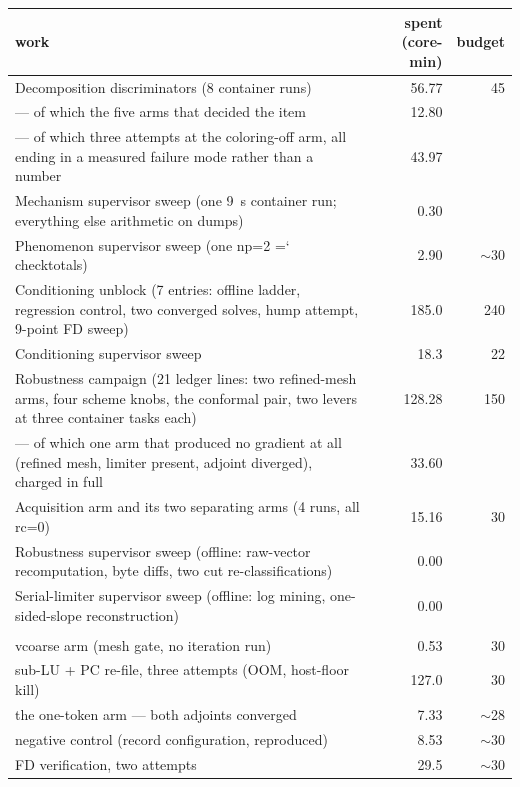 \documentclass[11pt,a4paper]{article}
\newcommand{\artifact}[1]{{\small\ttfamily\hyphenchar\font=`\-\relax
  \def\_{\textunderscore\allowbreak}#1}}
\begin{document}
\begin{table}[htbp]
\centering\scriptsize
\begin{tabular}{@{}L{7.0cm}rr@{}}
\toprule
work & spent (core-min) & budget \\
\midrule
Decomposition discriminators (8 container runs) & 56.77 & 45 \\
\quad --- of which the five arms that decided the item & 12.80 & \\
\quad --- of which three attempts at the coloring-off arm, all ending in a measured failure mode rather than a number & 43.97 & \\
Mechanism supervisor sweep (one 9~s container run; everything else arithmetic on dumps) & 0.30 & \\
Phenomenon supervisor sweep (one np=2 \artifact{check\_totals}) & 2.90 & $\sim$30 \\
Conditioning unblock (7 entries: offline ladder, regression control, two converged solves, hump attempt, 9-point FD sweep) & 185.0 & 240 \\
Conditioning supervisor sweep & 18.3 & 22 \\
Robustness campaign (21 ledger lines: two refined-mesh arms, four scheme knobs, the conformal pair, two levers at three container tasks each) & 128.28 & 150 \\
\quad --- of which one arm that produced no gradient at all (refined mesh, limiter present, adjoint diverged), charged in full & 33.60 & \\
Acquisition arm and its two separating arms (4 runs, all rc=0) & 15.16 & 30 \\
Robustness supervisor sweep (offline: raw-vector recomputation, byte diffs, two cut re-classifications) & 0.00 & \\
Serial-limiter supervisor sweep (offline: log mining, one-sided-slope reconstruction) & 0.00 & \\
\addlinespace
{}\\
\quad vcoarse arm (mesh gate, no iteration run) & 0.53 & 30 \\
\quad sub-LU + PC re-file, three attempts (OOM, host-floor kill) & 127.0 & 30 \\
\quad the one-token arm --- both adjoints converged & 7.33 & $\sim$28 \\
\quad negative control (record configuration, reproduced) & 8.53 & $\sim$30 \\
\quad FD verification, two attempts & 29.5 & $\sim$30 \\

\end{tabular}
\end{table}
\end{document}

